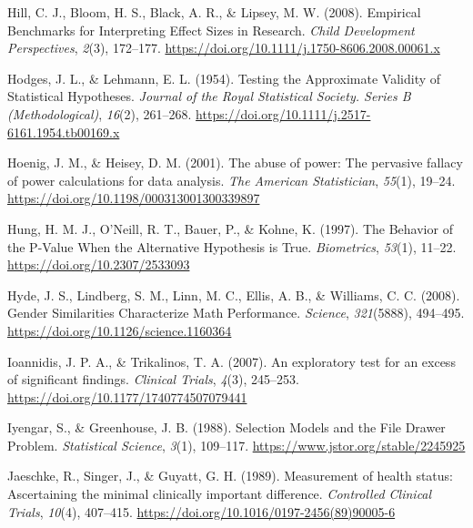 \documentclass[
  letterpaper,
  DIV=11,
  numbers=noendperiod]{scrreprt}
\newlength{\cslhangindent}
\newlength{\cslentryspacingunit} %
\newenvironment{CSLReferences}[2] %
 {%
  \setlength{\parindent}{0pt}
  \ifodd #1
  \let\oldpar\par
  \def\par{\hangindent=\cslhangindent\oldpar}
  \fi
  \setlength{\parskip}{#2\cslentryspacingunit}
 }%
 {}
\begin{document}
\begin{CSLReferences}{1}{0}
\leavevmode{}%
Hill, C. J., Bloom, H. S., Black, A. R., \& Lipsey, M. W. (2008).
Empirical {Benchmarks} for {Interpreting Effect Sizes} in {Research}.
\emph{Child Development Perspectives}, \emph{2}(3), 172--177.
\url{https://doi.org/10.1111/j.1750-8606.2008.00061.x}

\leavevmode{}%
Hodges, J. L., \& Lehmann, E. L. (1954). Testing the {Approximate
Validity} of {Statistical Hypotheses}. \emph{Journal of the Royal
Statistical Society. Series B (Methodological)}, \emph{16}(2), 261--268.
\url{https://doi.org/10.1111/j.2517-6161.1954.tb00169.x}

\leavevmode{}%
Hoenig, J. M., \& Heisey, D. M. (2001). The abuse of power: The
pervasive fallacy of power calculations for data analysis. \emph{The
American Statistician}, \emph{55}(1), 19--24.
\url{https://doi.org/10.1198/000313001300339897}

\leavevmode{}%
Hung, H. M. J., O'Neill, R. T., Bauer, P., \& Kohne, K. (1997). The
{Behavior} of the {P-Value When} the {Alternative Hypothesis} is {True}.
\emph{Biometrics}, \emph{53}(1), 11--22.
\url{https://doi.org/10.2307/2533093}

\leavevmode{}%
Hyde, J. S., Lindberg, S. M., Linn, M. C., Ellis, A. B., \& Williams, C.
C. (2008). Gender {Similarities Characterize Math Performance}.
\emph{Science}, \emph{321}(5888), 494--495.
\url{https://doi.org/10.1126/science.1160364}

\leavevmode{}%
Ioannidis, J. P. A., \& Trikalinos, T. A. (2007). An exploratory test
for an excess of significant findings. \emph{Clinical Trials},
\emph{4}(3), 245--253. \url{https://doi.org/10.1177/1740774507079441}

\leavevmode{}%
Iyengar, S., \& Greenhouse, J. B. (1988). Selection {Models} and the
{File Drawer Problem}. \emph{Statistical Science}, \emph{3}(1),
109--117. \url{https://www.jstor.org/stable/2245925}

\leavevmode{}%
Jaeschke, R., Singer, J., \& Guyatt, G. H. (1989). Measurement of health
status: {Ascertaining} the minimal clinically important difference.
\emph{Controlled Clinical Trials}, \emph{10}(4), 407--415.
\url{https://doi.org/10.1016/0197-2456(89)90005-6}


\end{CSLReferences}
\end{document}
